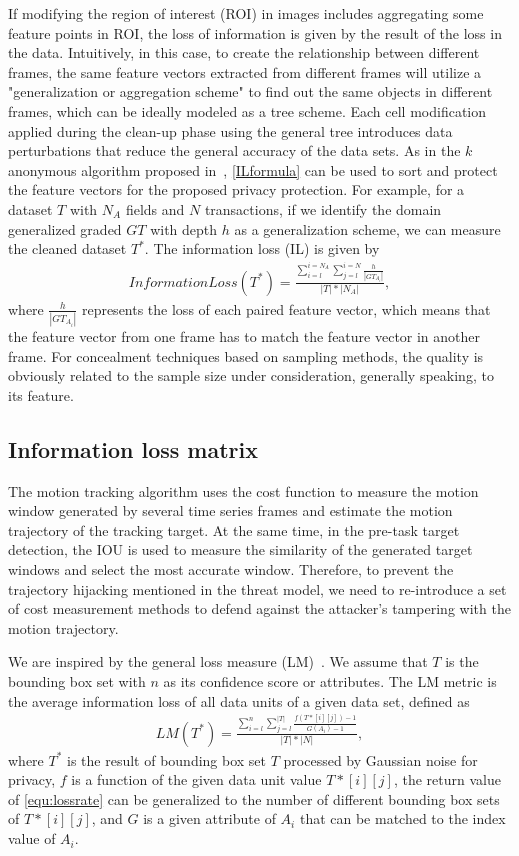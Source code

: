 \documentclass[trans]{IEEEtran}
\begin{document}
If modifying the region of interest (ROI) in images includes aggregating some feature points in ROI, the loss of information is given by the result of the loss in the data. Intuitively, in this case, to create the relationship between different frames, the same feature vectors extracted from different frames will utilize a "generalization or aggregation scheme" to find out the same objects in different frames, which can be ideally modeled as a tree scheme. Each cell modification applied during the clean-up phase using the general tree introduces data perturbations that reduce the general accuracy of the data sets. As in the $k$ anonymous algorithm proposed in~\cite{sweeney2002achieving}, \eqref{ILformula} can be used to sort and protect the feature vectors for the proposed privacy protection. For example, for a dataset $T$ with $N_A$ fields and $N$ transactions, if we identify the domain generalized graded $GT$ with depth $h$ as a generalization scheme, we can measure the cleaned dataset $T^*$. The information loss (IL) is given by
\begin{eqnarray}\label{ILformula}
Information Loss(T^*)=\frac{\sum^{i=N_A}_{i=l} \sum^{i=N}_{j=l} \frac{h}{|GT_{A_i}|} }{|T|*|N_A|},
\end{eqnarray}
where $\frac{h}{|GT_{A_i}|}$ represents the loss of each paired feature vector, which means that the feature vector from one frame has to match the feature vector in another frame. For concealment techniques based on sampling methods, the quality is obviously related to the sample size under consideration, generally speaking, to its feature.

\subsection{Information loss matrix}
The motion tracking algorithm uses the cost function to measure the motion window generated by several time series frames and estimate the motion trajectory of the tracking target. At the same time, in the pre-task target detection, the IOU is used to measure the similarity of the generated target windows and select the most accurate window. Therefore, to prevent the trajectory hijacking mentioned in the threat model, we need to re-introduce a set of cost measurement methods to defend against the attacker's tampering with the motion trajectory. 

We are inspired by the general loss measure (LM)~\cite{iyengar2002transforming}. We assume that $T$ is the bounding box set with $n$ as its confidence score or attributes. The LM metric is the average information loss of all data units of a given data set, defined as
\begin{eqnarray}\label{LMformula}
LM(T^*)=\frac{\sum^{n}_{i=l} \sum^{|T|}_{j=l} \frac{f(T*[i][j])-1}{G(A_i)-1} }{|T|*|N|},
\end{eqnarray}
where $T^*$ is the result of bounding box set $T$ processed by Gaussian noise for privacy, $f$ is a function of the given data unit value $T*[i][j]$, the return value of \eqref{equ:lossrate} can be generalized to the number of different bounding box sets of $T*[i][j]$, and $G$ is a given attribute of $A_i$ that can be matched to the index value of $A_i$.
\end{document}
